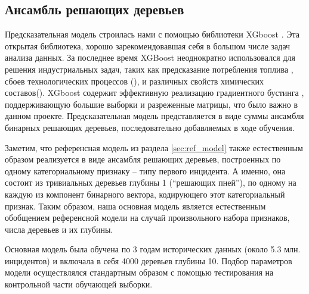\subsection{Ансамбль решающих деревьев}\label{sec:xgboost}
Предсказательная модель строилась нами с помощью библиотеки XGboost \cite{chen2016xgboost}. Эта открытая библиотека, хорошо зарекомендовавшая себя в большом числе задач анализа данных\cite{chen2016xgboost}. За последнее время XGBoost неоднократно использовался для решения индустриальных задач, таких как предсказание потребления топлива \cite{horituchi2017predicting}, сбоев технологических процессов (\cite{bosch,DBLP:conf/bigdataconf/Hebert16}), и различных свойств химических составов(\cite{sheridan2016extreme,babajide2016bioactive}). XGboost содержит эффективную реализацию градиентного бустинга \cite{friedman2001greedy}, поддерживающую большие выборки и разреженные матрицы, что было важно в данном проекте. Предсказательная модель представляется в виде суммы ансамбля  бинарных решающих деревьев, последовательно добавляемых в ходе обучения. 

Заметим, что референсная модель из раздела  \ref{sec:ref_model} также естественным образом реализуется в виде ансамбля решающих деревьев, построенных по одному категориальному признаку -- типу первого инцидента. А именно, она состоит из тривиальных деревьев глубины 1 (``решающих пней''), по одному на каждую из компонент бинарного вектора, кодирующего этот категориальный признак. Таким образом, наша основная модель является естественным обобщением референсной модели на случай произвольного набора признаков, числа деревьев и их глубины.

Основная модель была обучена по 3 годам исторических данных (около 5.3 млн. инцидентов) и включала в себя 4000 деревьев глубины 10. Подбор параметров модели осуществлялся стандартным образом с помощью тестирования на контрольной части обучающей выборки.


